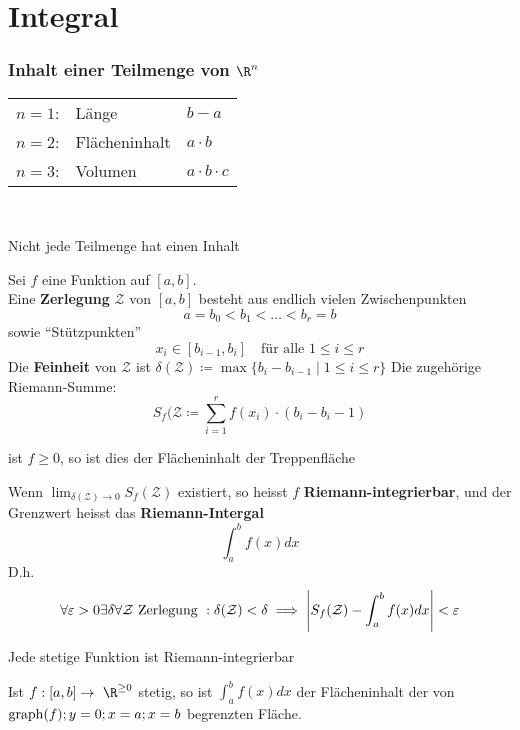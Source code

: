 \chapter{Integral}
\subsection{Inhalt einer Teilmenge von \texorpdfstring{$\R^n$}{R^n}}
\begin{tabular}{ l l l }
	$n=1$:	&Länge		&$b-a$			\\
	$n=2$:	&Flächeninhalt	&$a \cdot b$		\\
	$n=3$:	&Volumen		&$a \cdot b \cdot c$	
\end{tabular}\\
\begin{bem}
	Nicht jede Teilmenge hat einen Inhalt
\end{bem}
Sei $f$ eine Funktion auf $[a,b]$. \\
Eine \textbf{Zerlegung} $\mathcal{Z}$ von $[a,b]$ besteht aus endlich vielen Zwischenpunkten
\[ a = b_0 < b_1 < \dots < b_r = b \]
sowie \enquote{Stützpunkten}
\[ x_i \in [b_{i-1},b_i] \quad \text{für alle } 1 \leq i \leq r \]
Die \textbf{Feinheit} von $\mathcal{Z}$ ist $\delta(\mathcal{Z}) \coloneqq \max\{ b_i - b_{i-1} \mid 1 \leq i \leq r \}$
Die zugehörige Riemann-Summe:
\[ S_f(\mathcal{Z} \coloneqq \sum_{i=1}^r f(x_i) \cdot (b_i - b_i-1) \]
\begin{bem}
	ist $f \geq 0$, so ist dies der Flächeninhalt der Treppenfläche
\end{bem}
\begin{def*}[note = Riemann-Integral , index = Riemann-Integral]
	Wenn $\lim_{\delta(\mathcal{Z}) \rightarrow 0} S_f(\mathcal{Z})$ existiert, so heisst $f$ \textbf{Riemann-integrierbar}, und der Grenzwert heisst das \textbf{Riemann-Intergal}
	\[ \int_a^b f(x) dx \]
	D.h.
	\[ \forall \epsilon > 0 \exists \delta \forall \mathcal{Z} \text{ Zerlegung }: \delta(\mathcal{Z}) < \delta \implies \abs{S_f(\mathcal{Z}) - \int_a^b f(x) dx} < \epsilon \]
\end{def*}
\begin{satz*}
	Jede stetige Funktion ist Riemann-integrierbar
\end{satz*}
\begin{fakt}
	Ist $f: [a,b] \rightarrow \R^{\geq 0}$ stetig, so ist $\int_a^b f(x) dx$ der Flächeninhalt der von $\operatorname{graph}(f) ; y = 0 ; x = a ; x = b$ begrenzten Fläche.
\end{fakt}

